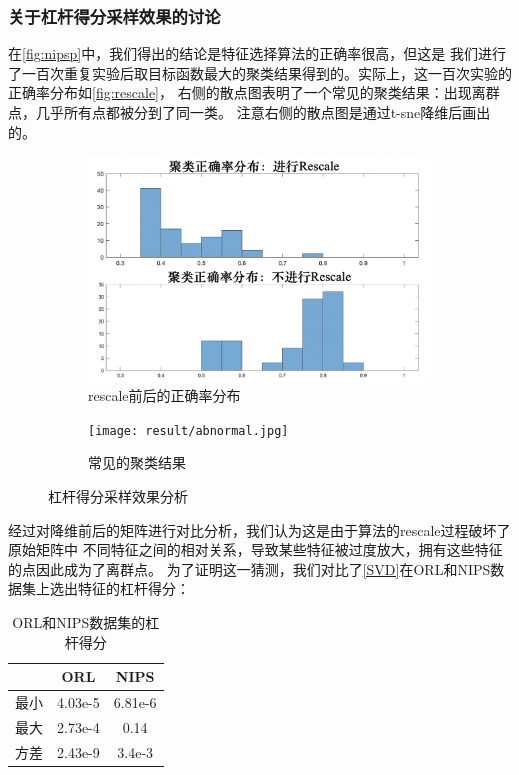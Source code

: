 \documentclass{ctexart}
\begin{document}
    \subsubsection{关于杠杆得分采样效果的讨论}
    \label{sec:lsdis}
    在\autoref{fig:nipsp}中，我们得出的结论是特征选择算法的正确率很高，但这是
    我们进行了一百次重复实验后取目标函数最大的聚类结果得到的。实际上，这一百次实验的正确率分布如\autoref{fig:rescale}，
    右侧的散点图表明了一个常见的聚类结果：出现离群点，几乎所有点都被分到了同一类。
    注意右侧的散点图是通过t-sne\cite{maaten2008visualizing}降维后画出的。

    \begin{figure}[H]
        \centering
        \begin{subfigure}{.5\textwidth}
            \centering
            \includegraphics[width=1.0\linewidth]{result/nipscmp.png}
            \caption{rescale前后的正确率分布}
        \end{subfigure}%
        \begin{subfigure}{.5\textwidth}
            \centering
            \texttt{[image: result/abnormal.jpg]}
            \caption{常见的聚类结果}
        \end{subfigure}
        \caption{杠杆得分采样效果分析}
        \label{fig:rescale}
    \end{figure}

    经过对降维前后的矩阵进行对比分析，我们认为这是由于算法的rescale过程破坏了原始矩阵中
    不同特征之间的相对关系，导致某些特征被过度放大，拥有这些特征的点因此成为了离群点。
    为了证明这一猜测，我们对比了\autoref{SVD}在ORL和NIPS数据集上选出特征的杠杆得分：

    \begin{table}[h]
        \centering
        \begin{tabular}{|c|c|c|}
            \hline
            & ORL & NIPS \\ \hline
            最小 & 4.03e-5 & 6.81e-6 \\ \hline
            最大 & 2.73e-4 & 0.14 \\ \hline
            方差 & 2.43e-9 & 3.4e-3 \\ \hline
        \end{tabular}
        \caption{ORL和NIPS数据集的杠杆得分}
        \label{table:cmp}
    \end{table}
\end{document}

